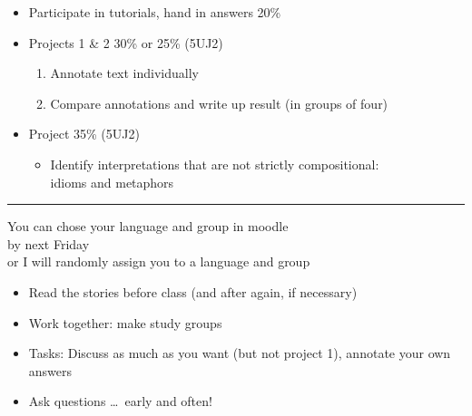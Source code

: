 \documentclass[a4paper,landscape,headrule,footrule,xetex,25pt]{foils}
\begin{document}
\begin{itemize}
\item Participate in tutorials, hand in answers \hfill  20\%
\item Projects 1 \& 2  \hfill 30\% or 25\% (5UJ2)
  \begin{enumerate}
  \item Annotate text individually
  \item Compare annotations and write up result (in groups of four)
  \end{enumerate}
\item Project 3\hfill 5\% (5UJ2)
  \begin{itemize}
  \item Identify interpretations that are not strictly compositional: \\
    idioms and metaphors
  \end{itemize}

\end{itemize}
\hrule
\begin{center}
      You can chose your language and group in moodle \\
      by next Friday \\
      or I will randomly assign you to a language and group
    \end{center}



\begin{itemize}
\item Read the stories before class (and after again, if necessary)
\item Work together: make study groups
\item Tasks: Discuss as much as you want (but not project 1), annotate your own answers
\item Ask questions \ldots\ early and often!
\end{itemize}


  
\small





\end{document}
